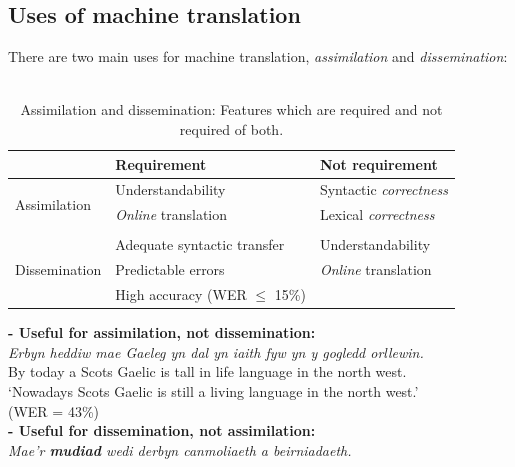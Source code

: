 \documentclass[a4paper,english,12pt]{article}
\begin{document}
\begin{spacing}{1.0}
\subsection{Uses of machine translation}


There are two main uses for machine translation, \emph{assimilation} and \emph{dissemination}:\\
~\\
\begin{table}
\centering
\begin{tabular}{l|l|l}
~  & Requirement & Not requirement\\
\hline
\multirow{3}{*}{Assimilation} & Understandability         & Syntactic \emph{correctness}\\
                              & \emph{Online} translation & Lexical \emph{correctness}\\
                              &                  & \\
\hline
\multirow{3}{*}{Dissemination} & Adequate syntactic transfer & Understandability \\
                               &  Predictable errors   & \emph{Online} translation \\
                               &  High accuracy (WER $\le$ 15\%)    & \\
\hline
\end{tabular}
\caption{Assimilation and dissemination: Features which are required and not required of both.}
\end{table}



\textbf{- Useful for assimilation, not dissemination:}\\


\emph{Erbyn heddiw mae Gaeleg yn dal yn iaith fyw yn y gogledd orllewin. }\\


By today a Scots Gaelic is tall in life language in the north west.\\


`Nowadays Scots Gaelic is still a living language in the north west.'\\ (WER = 43\%)\\

\textbf{- Useful for dissemination, not assimilation:}\\

\emph{Mae'r \textbf{mudiad} wedi derbyn canmoliaeth a beirniadaeth.}\\



\end{spacing}
\end{document}
